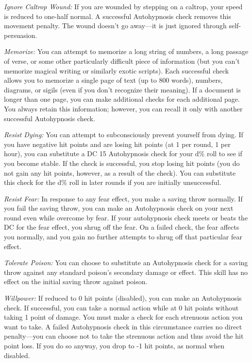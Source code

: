 \documentclass{article}
\begin{document}
\textit{Ignore Caltrop Wound: }If you are wounded by stepping on a caltrop, your 
speed is reduced to one-half normal. A successful Autohypnosis check removes this 
movement penalty. The wound doesn't go away---it is just ignored through self-persuasion.

\textit{Memorize: }You can attempt to memorize a long string of numbers, a long 
passage of verse, or some other particularly difficult piece of information (but 
you can't memorize magical writing or similarly exotic scripts). Each successful 
check allows you to memorize a single page of text (up to 800 words), numbers, 
diagrams, or sigils (even if you don't recognize their meaning). If a document 
is longer than one page, you can make additional checks for each additional page. 
You always retain this information; however, you can recall it only with another 
successful Autohypnosis check.

\textit{Resist Dying: }You can attempt to subconsciously prevent yourself from 
dying. If you have negative hit points and are losing hit points (at 1 per round, 
1 per hour), you can substitute a DC 15 Autohypnosis check for your d\% roll to 
see if you become stable. If the check is successful, you stop losing hit points 
(you do not gain any hit points, however, as a result of the check). You can substitute 
this check for the d\% roll in later rounds if you are initially unsuccessful.

\textit{Resist Fear: }In response to any fear effect, you make a saving throw normally. 
If you fail the saving throw, you can make an Autohypnosis check on your next round 
even while overcome by fear. If your autohypnosis check meets or beats the DC for 
the fear effect, you shrug off the fear. On a failed check, the fear affects you 
normally, and you gain no further attempts to shrug off that particular fear effect.

\textit{Tolerate Poison: }You can choose to substitute an Autohypnosis check for 
a saving throw against any standard poison's secondary damage or effect. This skill 
has no effect on the initial saving throw against poison.

\textit{Willpower: }If reduced to 0 hit points (disabled), you can make an Autohypnosis 
check. If successful, you can take a normal action while at 0 hit points without 
taking 1 point of damage. You must make a check for each strenuous action you want 
to take. A failed Autohypnosis check in this circumstance carries no direct penalty---you 
can choose not to take the strenuous action and thus avoid the hit point loss. 
If you do so anyway, you drop to -1 hit points, as normal when disabled.
\end{document}
